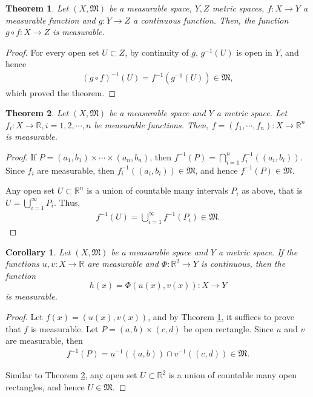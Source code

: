\documentclass[11pt]{book}
\newtheorem{theorem}{Theorem}[chapter]
\newtheorem{corollary}{Corollary}[theorem]
\theoremstyle{definition}
\numberwithin{equation}{chapter}
\begin{document}
\medskip

\begin{theorem}\label{theorem_21}
Let $(X,\mathfrak{M})$ be a measurable space, $Y,Z$ metric spaces, $f:X \to Y$ a measurable function and $g:Y \to Z$ a continuous function. Then, the function $g\circ f: X \to Z$ is measurable.
\end{theorem}
\begin{proof}
For every open set $U \subset Z$, by continuity of $g$, $g^{-1}(U)$ is open in $Y$, and hence
\begin{align*}
    (g\circ f)^{-1}(U) = f^{-1} \left(g^{-1}(U)\right) \in \mathfrak{M},
\end{align*}
which proved the theorem.
\end{proof}

\medskip

\begin{theorem}\label{theorem_22}
Let $(X,\mathfrak{M})$ be a measurable space and $Y$ a metric space. Let $f_i: X \to \mathbb{R}, i = 1,2,\cdots,n$ be measurable functions. Then, $f = (f_1,\cdots,f_n):X\to\mathbb{R}^n$ is measurable.
\end{theorem}
\begin{proof}
If $P = (a_1,b_1)\times\cdots\times(a_n,b_n)$, then $f^{-1}(P) = \bigcap^n_{i=1} f_i^{-1}((a_i,b_i))$. Since $f_i$ are measurable, then $f_i^{-1}((a_i,b_i)) \in \mathfrak{M}$, and hence $f^{-1}(P) \in \mathfrak{M}$. 

Any open set $U \subset \mathbb{R}^n$ is a union of countable many intervals $P_i$ as above, that is $U = \bigcup^\infty_{i=1} P_i$. Thus, 
\begin{align*}
    f^{-1}(U) = \bigcup^\infty_{i=1} f^{-1}(P_i) \in \mathfrak{M}.
\end{align*}
\end{proof}

\medskip

\begin{corollary}
Let $(X,\mathfrak{M})$ be a measurable space and $Y$ a metric space. If the functions $u,v:X\to\mathbb{R}$ are measurable and $\Phi:\mathbb{R}^2 \to Y$ is continuous, then the function
$$h(x) = \Phi(u(x),v(x)): X \to Y$$
is measurable.
\end{corollary}
\begin{proof}
Let $f(x) = (u(x),v(x))$, and by Theorem \ref{theorem_21}, it suffices to prove that $f$ is measurable. Let $P = (a,b) \times (c,d)$ be open rectangle. Since $u$ and $v$ are measurable, then
\begin{align*}
    f^{-1}(P) = u^{-1}((a,b)) \cap v^{-1}((c,d)) \in \mathfrak{M}.
\end{align*}

Similar to Theorem \ref{theorem_22}, any open set $U \subset \mathbb{R}^2$ is a union of countable many open rectangles, and hence $U \in \mathfrak{M}$.
\end{proof}
\end{document}
